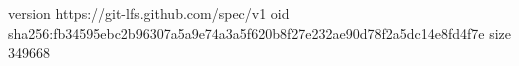 version https://git-lfs.github.com/spec/v1
oid sha256:fb34595ebc2b96307a5a9e74a3a5f620b8f27e232ae90d78f2a5dc14e8fd4f7e
size 349668
